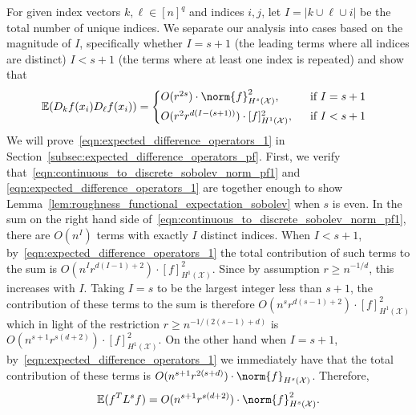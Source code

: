\documentclass{article}
\newcommand{\abs}[1]{\left \lvert #1 \right \rvert}
\newcommand{\1}{\mathbf{1}}
\newcommand{\Xset}{\mathcal{X}}
\newcommand{\Ebb}{\mathbb{E}}
\theoremstyle{alden}
\theoremstyle{aldenthm}
\theoremstyle{definition}
\theoremstyle{remark}
\begin{document}
For given index vectors $k,\ell \in [n]^q$ and indices $i,j$, let $I = \abs{k \cup \ell \cup i}$ be the total number of unique indices. We separate our analysis into cases based on the magnitude of $I$, specifically whether $I = s + 1$ (the leading terms where all indices are distinct) $I < s + 1$ (the terms where at least one index is repeated) and show that
\begin{equation}
\label{eqn:expected_difference_operators_1}
\Ebb(D_kf(x_i) D_\ell f(x_i)) =
\begin{cases*}
O(r^{2s}) \cdot \norm{f}_{H^s(\Xset)}^2, & ~~\textrm{if $I = s + 1$} \\
O(r^{2} r^{d(I - (s + 1))}) \cdot [f]_{H^1(\Xset)}^2, & ~~\textrm{if $I < s + 1$}~ 
\end{cases*}
\end{equation}
We will prove~\eqref{eqn:expected_difference_operators_1} in Section~\ref{subsec:expected_difference_operators_pf}. First, we verify that~\eqref{eqn:continuous_to_discrete_sobolev_norm_pf1} and \eqref{eqn:expected_difference_operators_1} are together enough to show Lemma~\ref{lem:roughness_functional_expectation_sobolev} when $s$ is even. In the sum on the right hand side of~\eqref{eqn:continuous_to_discrete_sobolev_norm_pf1}, there are $O(n^{I})$ terms with exactly $I$ distinct indices. When $I < s + 1$, by~\eqref{eqn:expected_difference_operators_1} the total contribution of such terms to the sum is $O(n^{I}r^{d(I - 1) + 2}) \cdot [f]_{H^1(\Xset)}^2$. Since by assumption $r \geq n^{-1/d}$, this increases with $I$. Taking $I = s$ to be the largest integer less than $s + 1$, the contribution of these terms to the sum is therefore $O(n^sr^{d(s - 1) + 2}) \cdot [f]_{H^1(\Xset)}^2$ which in light of the restriction $r \geq n^{-1/(2(s - 1) + d)}$ is $O(n^{s+1}r^{s(d +2)}) \cdot [f]_{H^1(\Xset)}^2$. On the other hand when $I = s + 1$, by~\eqref{eqn:expected_difference_operators_1} we immediately have that the total contribution of these terms is $O(n^{s + 1}r^{2(s + d)}) \cdot \norm{f}_{H^s(\Xset)}$. Therefore,
\begin{equation*}
\Ebb(f^T L^s f) = O(n^{s+1}r^{s(d+2)}) \cdot \norm{f}_{H^s(\Xset)}^2.
\end{equation*}
\end{document}
